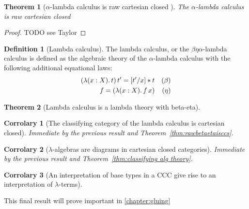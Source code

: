 \documentclass[12pt,twoside]{reedthesis}
\theoremstyle{definition}
\newtheorem{definition}{Definition}
\theoremstyle{remark}
\theoremstyle{plain}
\newtheorem{theorem}{Theorem}
\newtheorem{corrolary}{Corrolary}
\begin{document}
\begin{theorem}[$\alpha$-lambda calculus is raw cartesian closed ]
  The $\alpha$-lambda calculus is raw cartesian closed
\end{theorem}
\begin{proof}
  TODO see Taylor
\end{proof}

\begin{definition}[Lambda calculus]
  The lambda calculus, or the $\beta\eta\alpha$-lambda calculus is defined as the algebraic
  theory of the $\alpha$-lambda calculus with the following additional equational
  laws:
  \begin{align*}
    (\lambda (x:X).\, t)\, t' = [t'/x]*t && (\beta)\\
    f = (\lambda (x:X).\, f\, x) && (\eta)\\
  \end{align*}
\end{definition}

\begin{theorem}[Lambda calculus is a lambda theory with beta-eta]
\end{theorem}

\begin{corrolary}[The classifying category of the lambda calculus is cartesian closed]
  Immediate by the previous result and Theorem~\ref{thm:rawbetaetaisccs}.
\end{corrolary}

\begin{corrolary}[$\lambda$-algebras are diagrams in cartesian closed categories]
  Immediate by the previous result and Theorem~\ref{thm:classifying alg theory}.
\end{corrolary}

\begin{corrolary}[An interpretation of base types in a CCC give rise to an interpretation of $\lambda$-terms]
\end{corrolary}

This final result will prove important in \ref{chapter:gluing}
\end{document}
